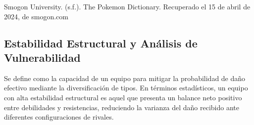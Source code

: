 \documentclass[oneside,11pt]{Latex/Classes/PhDthesisPSnPDF}
\begin{document}
Smogon University. (s.f.). The Pokemon Dictionary. Recuperado el 15 de
abril de 2024, de smogon.com

\subsection{Estabilidad Estructural y Análisis de Vulnerabilidad}

Se define como la capacidad de un equipo para mitigar la probabilidad de
daño efectivo mediante la diversificación de tipos. En términos
estadísticos, un equipo con alta estabilidad estructural es aquel que
presenta un balance neto positivo entre debilidades y resistencias,
reduciendo la varianza del daño recibido ante diferentes configuraciones
de rivales.\\

\begin{table}[!h]
\centering
\caption{\label{tab:unnamed-chunk-1}Matriz de Efectividades: Acero a Hielo (Defensores)}
\centering
{}
\end{table}
\end{document}
